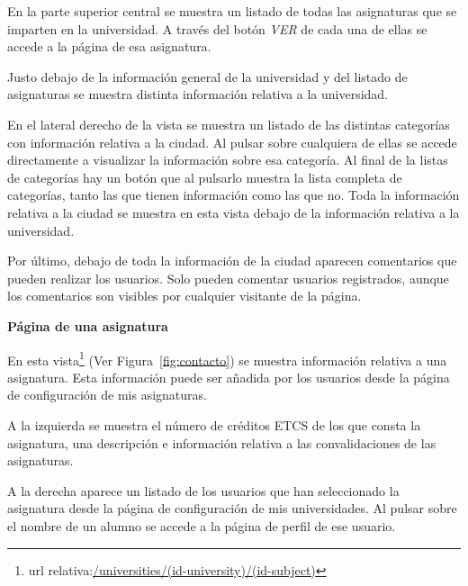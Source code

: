 \documentclass[a4paper, 12pt]{book}
\begin{document}
En la parte superior central se muestra un listado de todas las asignaturas que se imparten en la universidad. A través del botón \textit{VER} de cada una de ellas se accede a la página de esa asignatura.
\newline

Justo debajo de la información general de la universidad y del listado de asignaturas se muestra distinta información relativa a la universidad.
\newline

En el lateral derecho de la vista se muestra un listado de las distintas categorías con información relativa a la ciudad. Al pulsar sobre cualquiera de ellas se accede directamente a visualizar la información sobre esa categoría. Al final de la listas de categorías hay un botón que al pulsarlo muestra la lista completa de categorías, tanto las que tienen información como las que no. Toda la información relativa a la ciudad se muestra en esta vista debajo de la información relativa a la universidad. 
\newline

Por último, debajo de toda la información de la ciudad aparecen comentarios que pueden realizar los usuarios. Solo pueden comentar usuarios registrados, aunque los comentarios son visibles por cualquier visitante de la página.

{\large  \textbf{Página de una asignatura}\par}

En esta vista\footnote{url relativa:\url{/universities/(id-university)/(id-subject)}} (Ver Figura~\ref{fig:contacto}) se muestra información relativa a una asignatura. Esta información puede ser añadida por los usuarios desde la página de configuración de mis asignaturas.
\newline

A la izquierda se muestra el número de créditos ETCS de los que consta la asignatura, una descripción e información relativa a las convalidaciones de las asignaturas.
\newline

A la derecha aparece un listado de los usuarios que han seleccionado la asignatura desde la página de configuración de mis universidades. Al pulsar sobre el nombre de un alumno se accede a la página de perfil de ese usuario.
\newline
\end{document}
